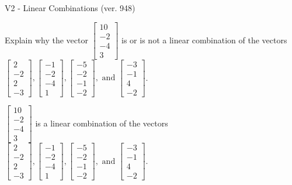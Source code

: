 \begin{exercise}
  \begin{exerciseTitle}V2 - Linear Combinations (ver. 948)\end{exerciseTitle}
  \begin{exerciseStatement}
    Explain why the vector \(\left[\begin{array}{c}
10 \\
-2 \\
-4 \\
3
\end{array}\right]\)  is or is not a linear 
	combination of the vectors \(\left[\begin{array}{c}
2 \\
-2 \\
2 \\
-3
\end{array}\right] , \left[\begin{array}{c}
-1 \\
-2 \\
-4 \\
1
\end{array}\right] , \left[\begin{array}{c}
-5 \\
-2 \\
-1 \\
-2
\end{array}\right] , \text{ and } \left[\begin{array}{c}
-3 \\
-1 \\
4 \\
-2
\end{array}\right]\).
	


  \end{exerciseStatement}
  \begin{exerciseAnswer}
   \(\left[\begin{array}{c}
10 \\
-2 \\
-4 \\
3
\end{array}\right]\) 
  	 is  
	a linear combination of the vectors \(\left[\begin{array}{c}
2 \\
-2 \\
2 \\
-3
\end{array}\right] , \left[\begin{array}{c}
-1 \\
-2 \\
-4 \\
1
\end{array}\right] , \left[\begin{array}{c}
-5 \\
-2 \\
-1 \\
-2
\end{array}\right] , \text{ and } \left[\begin{array}{c}
-3 \\
-1 \\
4 \\
-2
\end{array}\right]\).


\end{exerciseAnswer}
\end{exercise}

